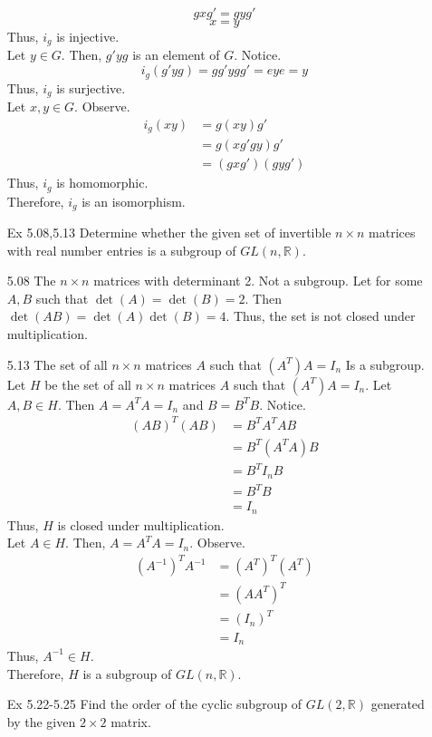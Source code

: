 \documentclass[12pt]{article}
\newcommand{\R}{\mathbb{R}}
\begin{document}
\begin{enumerate}
					\[gxg'=gyg'\]
					\[x=y\]
				Thus, $i_g $ is injective.\\
				Let $ y\in G $. Then, $ g'yg $ is an element of $ G $. Notice.
					\[i_g(g'yg)=gg'ygg'=eye=y\]
				Thus, $ i_g $ is surjective.\\
				Let $ x,y\in G $. Observe.
				\begin{align*}
					i_g(xy) &= g(xy)g'\\
							&= g(xg'gy)g'\\
							&= (gxg')(gyg')
				\end{align*}
				Thus, $ i_g $ is homomorphic.\\
				Therefore, $ i_g $ is an isomorphism.
		\item[Ex 5.08,5.13] Determine whether the given set of invertible $n \times  n$ matrices with real number entries is a subgroup of $GL(n,\R)$.
			\item[5.08] The $ n \times n $ matrices with determinant 2.
			Not a subgroup. Let for some  $ A,B$ such that $ \det(A)=\det(B)=2 $. Then $ \det(AB)=\det(A)\det(B)=4 $. Thus, the set is not closed under multiplication.
			\item[5.13] The set of all $n \times n$ matrices $A$ such that $(A^T)A=I_n$
			Is a subgroup.
			Let $ H $ be the set of all $n \times n$ matrices $A$ such that $(A^T)A=I_n$.
			Let $ A,B\in H $. Then $ A=A^TA=I_n $ and $ B=B^TB $. Notice.
			\begin{align*}
				(AB)^T(AB) &= B^TA^TAB\\
						   &= B^T(A^TA)B\\
						   &= B^TI_nB\\
						   &= B^TB \\
						   &= I_n
			\end{align*}
			Thus, $ H $ is closed under multiplication.\\
			Let $ A\in H $. Then, $ A=A^TA=I_n $. Observe. 
				\begin{align*}
					(A^{-1})^TA^{-1} &= (A^T)^T(A^T)\\
									 &= (AA^T)^T\\
									 &= (I_n)^T\\
									 &= I_n
				\end{align*}
				Thus, $ A^{-1}\in H $.\\
				Therefore, $ H $ is a subgroup of $ GL(n,\R) $.
		\item[Ex 5.22-5.25] Find the order of the cyclic subgroup of $GL(2,\R)$ generated by the given $2 \times 2$ matrix. 
		

\end{enumerate}
\end{document}
